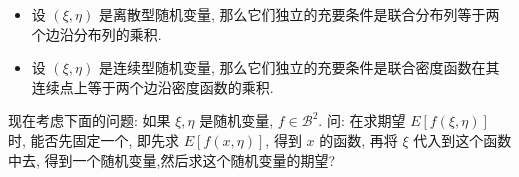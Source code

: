 \begin{proposition}
    \begin{itemize}
        \item 设 $(\xi, \eta)$ 是离散型随机变量, 那么它们独立的充要条件是联合分布列等于两个边沿分布列的乘积.
        \item 设 $(\xi, \eta)$ 是连续型随机变量, 那么它们独立的充要条件是联合密度函数在其连续点上等于两个边沿密度函数的乘积.
    \end{itemize}
\end{proposition}

现在考虑下面的问题: 如果 $\xi, \eta$ 是随机变量, $f \in \mathscr{B}^2$. 问: 在求期望 $E[f(\xi, \eta)]$ 时, 能否先固定一个, 即先求 $E[f(x, \eta)]$, 得到 $x$ 的函数, 再将 $\xi$ 代入到这个函数中去, 得到一个随机变量,然后求这个随机变量的期望?

